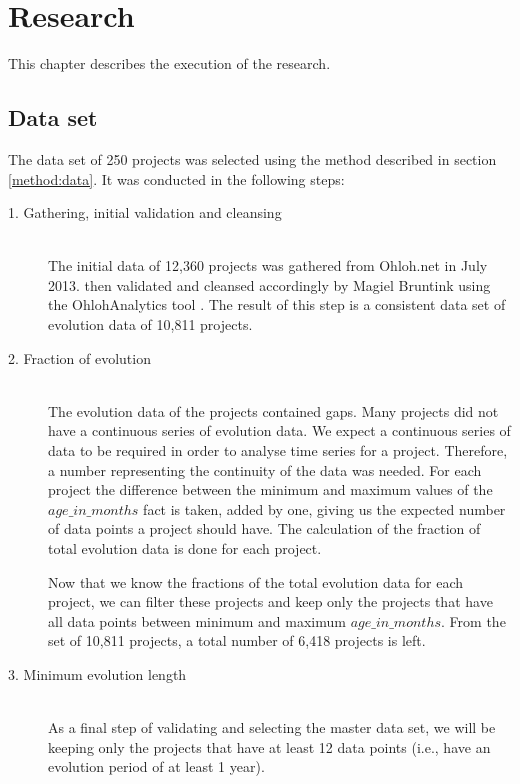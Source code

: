 \chapter{Research}
\label{research}

This chapter describes the execution of the research.

\section{Data set}
The data set of 250 projects was selected using the method described in section
\ref{method:data}. It was conducted in the following steps:

\begin{description}
	\item[1. Gathering, initial validation and cleansing] \hfill \\ The initial
	data of 12,360 projects was gathered from Ohloh.net in July 2013. then
	validated and cleansed accordingly by Magiel Bruntink using the OhlohAnalytics
	tool \cite{ohlohanalytics, bruntink2014}. The result of this step is a
	consistent data set of evolution data of 10,811 projects.

	\item[2. Fraction of evolution] \hfill \\ The evolution data of the
	projects contained gaps. Many projects did not have a continuous series of
	evolution data. We expect a continuous series of data to be required in order
	to analyse time series for a project. Therefore, a number representing the
	continuity of the data was needed. For each project the difference between the
	minimum and maximum values of the $age\_in\_months$ fact is taken, added by
	one, giving us the expected number of data points a project should have. The
	calculation of the fraction of total evolution data is done for each project.
	
	Now that we know the fractions of the total evolution data for each project, we
	can filter these projects and keep only the projects that have all data points
	between minimum and maximum $age\_in\_months$. From the set of 10,811
	projects, a total number of 6,418 projects is left.
	
	\item[3. Minimum evolution length] \hfill \\ As a final step of validating and
	selecting the master data set, we will be keeping only the projects that have
	at least 12 data points (i.e., have an evolution period of at least 1 year).
	

\end{description}
